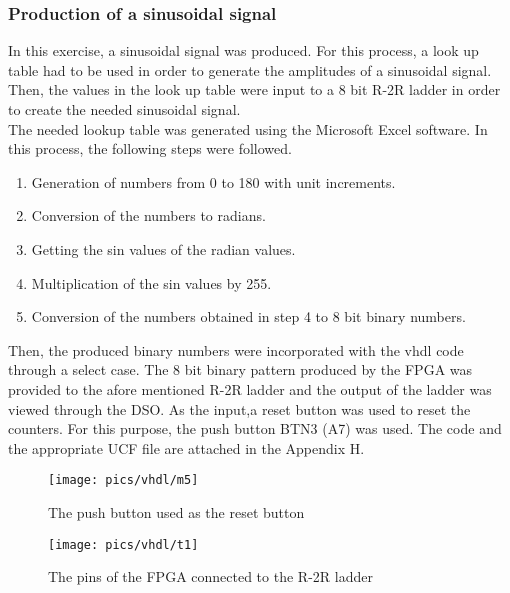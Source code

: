 \subsubsection{Production of a sinusoidal signal}

\noindent
In this exercise, a sinusoidal signal was produced. For this process, a look up table had to be used in order to generate the amplitudes of a sinusoidal signal. Then, the values in the look up table were input to a 8 bit R-2R ladder in order to create the needed sinusoidal signal.\\

\noindent
The needed lookup table was generated using the Microsoft Excel software. In this process, the following steps were followed.
\begin{enumerate}
	\item Generation of numbers from 0 to 180 with unit increments.
	\item Conversion of the numbers to radians.
	\item Getting the sin values of the radian values.
	\item Multiplication of the sin values by 255.
	\item Conversion of the numbers obtained in step 4 to 8 bit binary numbers.
\end{enumerate} 

\noindent
Then, the produced binary numbers were incorporated with the vhdl code through a select case. The 8 bit binary pattern produced by the FPGA was provided to the afore mentioned R-2R ladder and the output of the ladder was viewed through the DSO. As the input,a reset button was used to reset the counters. For this purpose,  the push button BTN3 (A7) was used. The  code and the appropriate UCF file are attached in the Appendix H.

\pagebreak


\begin{figure}[!h]
	\centering
	\texttt{[image: pics/vhdl/m5]}
	\caption{The push button used as the reset button}
	\label{fig:m5}
\end{figure}

\begin{figure}[!h]
	\centering
	\texttt{[image: pics/vhdl/t1]}
	\caption{The pins of the FPGA connected to the R-2R ladder}
	\label{fig:t1}
\end{figure}

\pagebreak

